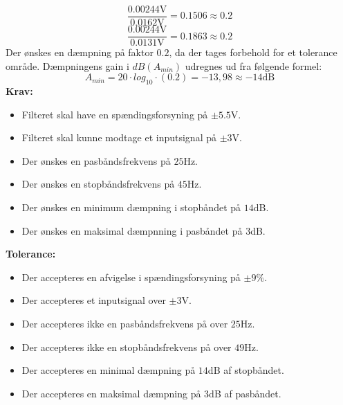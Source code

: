 \begin{equation}
\label{eq:daempningsfaktor}
\dfrac{0.00244\text{V}}{0.0162\text{V}} = 0.1506 \approx 0.2 
\end{equation}
\begin{equation}
\dfrac{0.00244\text{V}}{0.0131\text{V}} = 0.1863  \approx 0.2
\end{equation}
Der ønskes en dæmpning på faktor $0.2$, da der tages forbehold for et tolerance område. Dæmpningens gain i $dB(A_{min})$ udregnes ud fra følgende formel:   
\begin{equation}
\label{eq:daempningsfaktoridB}
A_{min}=20 \cdot log_{10} \cdot (0.2) = -13,98 \approx -14\text{dB}
\end{equation}
\textbf{Krav:}
\begin{itemize}
	\item Filteret skal have en spændingsforsyning på $\pm5.5$V.
	\item Filteret skal kunne modtage et inputsignal på $\pm3$V.
	\item Der ønskes en pasbåndsfrekvens på $25$Hz.
	\item Der ønskes en stopbåndsfrekvens på $45$Hz.
	\item Der ønskes en minimum dæmpning i stopbåndet på $14$dB.
	\item Der ønskes en maksimal dæmpnning i pasbåndet på $3$dB.
\end{itemize}
\noindent \textbf{Tolerance:}
\begin{itemize}
	\item Der accepteres en afvigelse i spændingsforsyning på $\pm9\%$.
	\item Der accepteres et inputsignal over $\pm3$V.
	\item Der accepteres ikke en pasbåndsfrekvens på over $25$Hz.
	\item Der accepteres ikke en stopbåndsfrekvens på over $49$Hz.
	\item Der accepteres en minimal dæmpning på $14$dB af stopbåndet.
	\item Der accepteres en maksimal dæmpning på $3$dB af pasbåndet.
\end{itemize}
